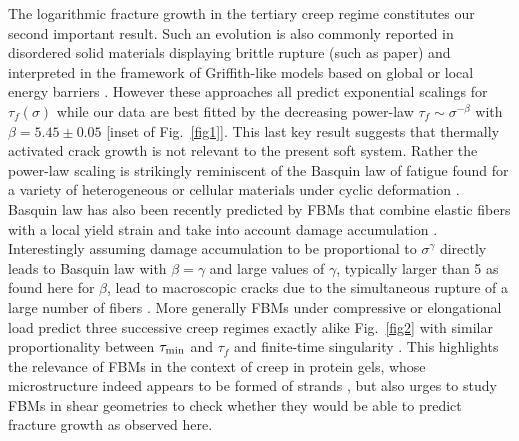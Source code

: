 \documentclass[twocolumn,superscriptaddress,showpacs,preprintnumbers,amsmath,amssymb,prl]{revtex4}
\begin{document}
The logarithmic fracture growth in the tertiary creep regime constitutes our second important result. Such an evolution is also commonly reported in disordered solid materials displaying brittle rupture (such as paper) and interpreted in the framework of Griffith-like models based on global or local energy barriers \cite{Vanel:2009}. However these approaches all predict exponential scalings for $\tau_f(\sigma)$ while our data are best fitted by the decreasing power-law $\tau_f \sim \sigma^{-\beta}$ with $\beta=5.45\pm 0.05$ [inset of Fig.~\ref{fig1}]. This last key result suggests that thermally activated crack growth is not relevant to the present soft system. Rather the power-law scaling is strikingly reminiscent of the Basquin law of fatigue found for a variety of heterogeneous or cellular materials under cyclic deformation \cite{Kun:2007,Basquin:1910,Suresh:2006}. Basquin law has also been recently predicted by FBMs that combine elastic fibers with a local yield strain and take into account damage accumulation \cite{Kun:2007,Halasz:2012}. Interestingly assuming damage accumulation to be proportional to $\sigma^\gamma$ directly leads to Basquin law with $\beta=\gamma$ and large values of $\gamma$, typically larger than 5 as found here for $\beta$, lead to macroscopic cracks due to the simultaneous rupture of a large number of fibers \cite{Halasz:2012}. More generally FBMs under compressive or elongational load predict three successive creep regimes exactly alike Fig.~\ref{fig2} with similar proportionality between $\tau_{\rm min}$ and $\tau_f$ and finite-time singularity \cite{Nechad:2005,Jagla:2011}. This highlights the relevance of FBMs in the context of creep in protein gels, whose microstructure indeed appears to be formed of strands \cite{Kalab:1983,Roefs:1990}, but also urges to study FBMs in shear geometries to check whether they would be able to predict fracture growth as observed here.
\end{document}
